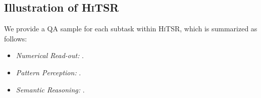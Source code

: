 \documentclass[11pt]{article}
\begin{document}
\subsection{Illustration of \textsc{HiTSR}} 
We provide a QA sample for each subtask within \textsc{HiTSR}, which is summarized as follows:
\begin{itemize}[left=0pt]
\setlength{\itemsep}{0.5pt}
    \item \emph{Numerical Read-out:} .
    \item \emph{Pattern Perception:} .
    \item \emph{Semantic Reasoning:} .
\end{itemize}
\end{document}
